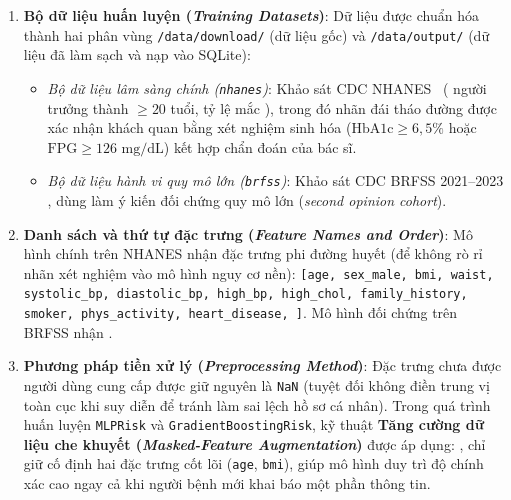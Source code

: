 \begin{enumerate}
  \item \textbf{Bộ dữ liệu huấn luyện (\emph{Training Datasets})}:
  Dữ liệu được chuẩn hóa thành hai phân vùng \texttt{/data/download/} (dữ liệu gốc) và \texttt{/data/output/} (dữ liệu đã làm sạch và nạp vào SQLite):
  \begin{itemize}
    \item \emph{Bộ dữ liệu lâm sàng chính (\texttt{nhanes})}: Khảo sát CDC NHANES~\cite{nhanes} ( người trưởng thành $\ge 20$ tuổi, tỷ lệ mắc ), trong đó nhãn đái tháo đường được xác nhận khách quan bằng xét nghiệm sinh hóa ($\text{HbA1c} \ge 6{,}5\%$ hoặc $\text{FPG} \ge 126\text{ mg/dL}$) kết hợp chẩn đoán của bác sĩ.
    \item \emph{Bộ dữ liệu hành vi quy mô lớn (\texttt{brfss})}: Khảo sát CDC BRFSS 2021--2023 , dùng làm ý kiến đối chứng quy mô lớn (\emph{second opinion cohort}).
  \end{itemize}

  \item \textbf{Danh sách và thứ tự đặc trưng (\emph{Feature Names and Order})}:
  Mô hình chính trên NHANES nhận  đặc trưng phi đường huyết (để không rò rỉ nhãn xét nghiệm vào mô hình nguy cơ nền): \texttt{[age, sex\_male, bmi, waist, systolic\_bp, diastolic\_bp, high\_bp, high\_chol, family\_history, smoker, phys\_activity, heart\_disease, ]}. Mô hình đối chứng trên BRFSS nhận .

  \item \textbf{Phương pháp tiền xử lý (\emph{Preprocessing Method})}:
  Đặc trưng chưa được người dùng cung cấp được giữ nguyên là \texttt{NaN} (tuyệt đối không điền trung vị toàn cục khi suy diễn để tránh làm sai lệch hồ sơ cá nhân). Trong quá trình huấn luyện \texttt{MLPRisk} và \texttt{GradientBoostingRisk}, kỹ thuật \textbf{Tăng cường dữ liệu che khuyết (\emph{Masked-Feature Augmentation})} được áp dụng: , chỉ giữ cố định hai đặc trưng cốt lõi (\texttt{age}, \texttt{bmi}), giúp mô hình duy trì độ chính xác cao ngay cả khi người bệnh mới khai báo một phần thông tin.


\end{enumerate}
